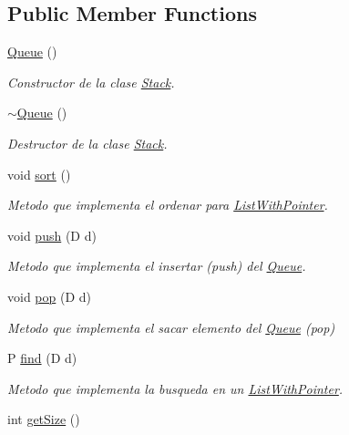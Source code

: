 \subsection*{Public Member Functions}
\begin{DoxyCompactItemize}
\item 
\hyperlink{class_queue_aaecc8eba91905e5bda9752e0f85a150e}{Queue} ()
\begin{DoxyCompactList}\small\item\em Constructor de la clase \hyperlink{class_stack}{Stack}. \end{DoxyCompactList}\item 
\hyperlink{class_queue_a4934a19723695272d8722a8fc2d84240}{$\sim$\+Queue} ()
\begin{DoxyCompactList}\small\item\em Destructor de la clase \hyperlink{class_stack}{Stack}. \end{DoxyCompactList}\item 
void \hyperlink{class_queue_a896b0e1bcac0d660079eb838c1823446}{sort} ()
\begin{DoxyCompactList}\small\item\em Metodo que implementa el ordenar para \hyperlink{class_list_with_pointer}{List\+With\+Pointer}. \end{DoxyCompactList}\item 
void \hyperlink{class_queue_a8779ae337e779be3dbff7c7bb8285428}{push} (D d)
\begin{DoxyCompactList}\small\item\em Metodo que implementa el insertar (push) del \hyperlink{class_queue}{Queue}. \end{DoxyCompactList}\item 
void \hyperlink{class_queue_a1543a11927722a9ef59806e7119634c4}{pop} (D d)
\begin{DoxyCompactList}\small\item\em Metodo que implementa el sacar elemento del \hyperlink{class_queue}{Queue} (pop) \end{DoxyCompactList}\item 
P \hyperlink{class_queue_a5c5ad7000d15506d3ec9c2ef6c8e6041}{find} (D d)
\begin{DoxyCompactList}\small\item\em Metodo que implementa la busqueda en un \hyperlink{class_list_with_pointer}{List\+With\+Pointer}. \end{DoxyCompactList}\item 
int \hyperlink{class_queue_ab2c7217e6737bf579493b321184a2db3}{get\+Size} ()

\end{DoxyCompactItemize}
